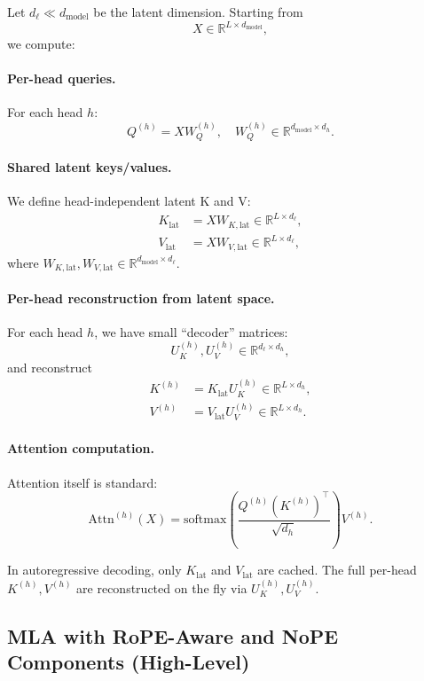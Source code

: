 \documentclass[11pt]{article}
\theoremstyle{remark}
\newcommand{\highlight}[1]{\colorbox{yellow!40}{#1}}
\begin{document}
Let $d_{\ell} \ll d_{\text{model}}$ be the latent dimension. Starting from
\[
X \in \mathbb{R}^{L \times d_{\text{model}}},
\]
we compute:

\paragraph{Per-head queries.}
For each head $h$:
\[
Q^{(h)} = X W_Q^{(h)}, \quad W_Q^{(h)} \in \mathbb{R}^{d_{\text{model}} \times d_h}.
\]

\paragraph{Shared latent keys/values.}
We define head-independent latent K and V:
\begin{align*}
K_{\text{lat}} &= X W_{K,\text{lat}} \in \mathbb{R}^{L \times d_{\ell}}, \\
V_{\text{lat}} &= X W_{V,\text{lat}} \in \mathbb{R}^{L \times d_{\ell}},
\end{align*}
where $W_{K,\text{lat}}, W_{V,\text{lat}} \in \mathbb{R}^{d_{\text{model}} \times d_{\ell}}$.

\paragraph{Per-head reconstruction from latent space.}
For each head $h$, we have small ``decoder'' matrices:
\[
U_K^{(h)}, U_V^{(h)} \in \mathbb{R}^{d_{\ell} \times d_h},
\]
and reconstruct
\begin{align*}
K^{(h)} &= K_{\text{lat}} U_K^{(h)} \in \mathbb{R}^{L \times d_h}, \\
V^{(h)} &= V_{\text{lat}} U_V^{(h)} \in \mathbb{R}^{L \times d_h}.
\end{align*}

\paragraph{Attention computation.}
Attention itself is standard:
\[
\text{Attn}^{(h)}(X)
=
\text{softmax}\!\left(
\frac{Q^{(h)} (K^{(h)})^{\top}}{\sqrt{d_h}}
\right) V^{(h)}.
\]

In \highlight{autoregressive decoding, only $K_{\text{lat}}$ and $V_{\text{lat}}$ are cached}. The full per-head $K^{(h)}, V^{(h)}$ are reconstructed on the fly via $U_K^{(h)}, U_V^{(h)}$.

\subsection{MLA with RoPE-Aware and NoPE Components (High-Level)}
\end{document}
